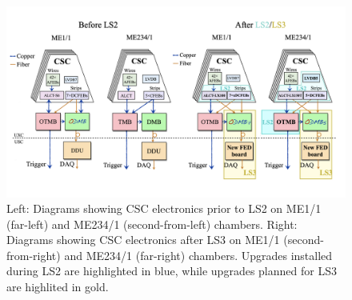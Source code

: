 \begin{figure}[H]
    \centering
    \includegraphics[width=1\textwidth]{Images/Phase2Upgrades/Electronics/CSCLS2Upgrades.png}
    \caption{Left: Diagrams showing CSC electronics prior to LS2 on ME1/1 (far-left) and ME234/1 (second-from-left) chambers. Right: Diagrams showing CSC electronics after LS3 on ME1/1 (second-from-right) and ME234/1 (far-right) chambers. Upgrades installed during LS2 are highlighted in blue, while upgrades planned for LS3 are highlited in gold.}
    \label{fig:CSCdiagram}
\end{figure}